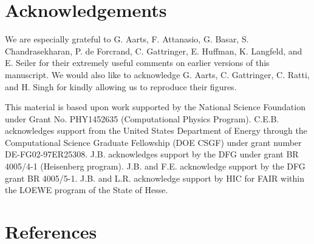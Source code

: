 \documentclass[3p]{elsarticle}
\begin{document}
\tableofcontents

\newpage







\section*{Acknowledgements}

We are especially grateful to G. Aarts, F. Attanasio, G. Basar, S. Chandrasekharan, P. de Forcrand, C. Gattringer, E. Huffman, K. Langfeld, and E. Seiler
for their extremely useful comments on earlier versions of this manuscript.
We would also like to acknowledge G. Aarts, C. Gattringer, C. Ratti, and H. Singh for kindly allowing us to reproduce their figures.

This material is based upon work supported by the National Science Foundation under
Grant No. PHY{1452635} (Computational Physics Program).
C.E.B. acknowledges support from the United States Department of Energy through the
Computational Science Graduate Fellowship (DOE CSGF) under grant number DE-FG02-97ER25308.
J.B. acknowledges support by the DFG under grant BR 4005/4-1 (Heisenberg program). J.B. and F.E. acknowledge 
support by the DFG grant BR 4005/5-1. 
J.B. and L.R. acknowledge support by HIC for FAIR within the LOEWE program of the State of Hesse.



\section*{References}
%


\end{document}
